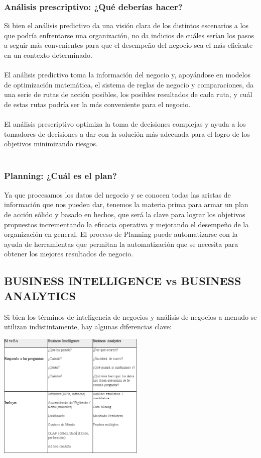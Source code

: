 \documentclass[twoside,twocolumn]{article}
\begin{document}
\subsubsection{Análisis prescriptivo: ¿Qué deberías hacer?}
Si bien el análisis predictivo da una visión clara de los distintos escenarios a los que podría enfrentarse una organización, no da indicios de cuáles serían los pasos a seguir más convenientes para que el desempeño del negocio sea el más eficiente en un contexto determinado.\\ \\
El análisis predictivo toma la información del negocio y, apoyándose en modelos de optimización matemática, el sistema de reglas de negocio y comparaciones, da una serie de rutas de acción posibles, los posibles resultados de cada ruta, y cuál de estas rutas podría ser la más conveniente para el negocio.\\ \\
El análisis prescriptivo optimiza la toma de decisiones complejas y ayuda a los tomadores de decisiones a dar con la solución más adecuada para el logro de los objetivos minimizando riesgos.\\ \\

\subsubsection{Planning: ¿Cuál es el plan?}
Ya que procesamos los datos del negocio y se conocen todas las aristas de información que nos pueden dar, tenemos la materia prima para armar un plan de acción sólido y basado en hechos, que será la clave para lograr los objetivos propuestos incrementando la eficacia operativa y mejorando el desempeño de la organización en general. El proceso de Planning puede automatizarse con la ayuda de herramientas que permitan la automatización que se necesita para obtener los mejores resultados de negocio.

\subsection{BUSINESS INTELLIGENCE vs BUSINESS ANALYTICS}
Si bien los términos de inteligencia de negocios y análisis de negocios a menudo se utilizan indistintamente, hay algunas diferencias clave:
\begin{center}
    \includegraphics[width=7cm]{./img/img3.png} 
\end{center}
\end{document}
